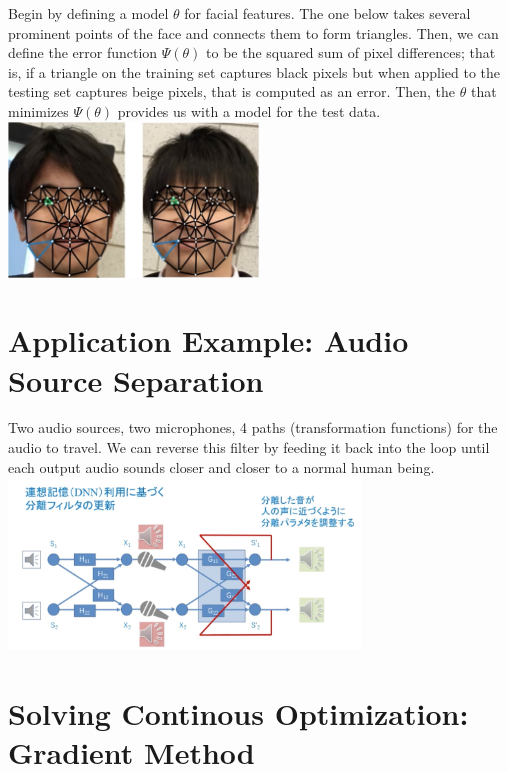 \documentclass[
]{article}
\begin{document}
Begin by defining a model \(\theta\) for facial features. The one below
takes several prominent points of the face and connects them to form
triangles. Then, we can define the error function \(\Psi(\theta)\) to be
the squared sum of pixel differences; that is, if a triangle on the
training set captures black pixels but when applied to the testing set
captures beige pixels, that is computed as an error. Then, the
\(\theta\) that minimizes \(\Psi(\theta)\) provides us with a model for
the test data.\\
\includegraphics[width=0.5\textwidth,height=\textheight]{4.jpg}

\hypertarget{application-example-audio-source-separation}{%
\section{Application Example: Audio Source
Separation}\label{application-example-audio-source-separation}}

Two audio sources, two microphones, 4 paths (transformation functions)
for the audio to travel. We can reverse this filter by feeding it back
into the loop until each output audio sounds closer and closer to a
normal human being.\\
\includegraphics[width=0.7\textwidth,height=\textheight]{5.jpg}

\hypertarget{solving-continous-optimization-gradient-method}{%
\section{Solving Continous Optimization: Gradient
Method}\label{solving-continous-optimization-gradient-method}}
\end{document}
